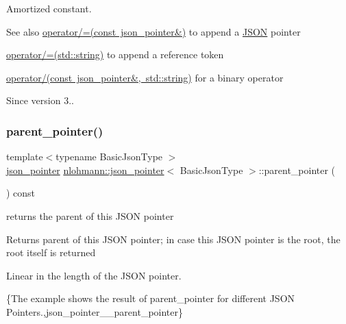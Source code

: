 Amortized constant.

\begin{DoxySeeAlso}{See also}
\mbox{\hyperlink{classnlohmann_1_1json__pointer_a7395bd0af29ac23fd3f21543c935cdfa}{operator/=(const json\+\_\+pointer\&)}} to append a \mbox{\hyperlink{cliente_8cpp_ab6104b89642419db4e355b7b2e40abbe}{J\+S\+ON}} pointer 

\mbox{\hyperlink{classnlohmann_1_1json__pointer_abdd21567b2b1d69329af0f520335e68b}{operator/=(std\+::string)}} to append a reference token 

\mbox{\hyperlink{classnlohmann_1_1json__pointer_a926c9065dbed1bedc17857a813f7a46f}{operator/(const json\+\_\+pointer\&, std\+::string)}} for a binary operator
\end{DoxySeeAlso}
\begin{DoxySince}{Since}
version 3.. 
\end{DoxySince}
\mbox{\label{classnlohmann_1_1json__pointer_afdaacce1edb7145e0434e014f0e8685a}} 
\subsubsection{\texorpdfstring{parent\+\_\+pointer()}{parent\_pointer()}}
{\footnotesize\ttfamily template$<$typename Basic\+Json\+Type $>$ \\
\mbox{\hyperlink{classnlohmann_1_1json__pointer}{json\+\_\+pointer}} \mbox{\hyperlink{classnlohmann_1_1json__pointer}{nlohmann\+::json\+\_\+pointer}}$<$ Basic\+Json\+Type $>$\+::parent\+\_\+pointer (\begin{DoxyParamCaption}{ }\end{DoxyParamCaption}) const\hspace{0.3cm}{\ttfamily [inline]}}



returns the parent of this J\+S\+ON pointer 

\begin{DoxyReturn}{Returns}
parent of this J\+S\+ON pointer; in case this J\+S\+ON pointer is the root, the root itself is returned
\end{DoxyReturn}
Linear in the length of the J\+S\+ON pointer.

\{The example shows the result of {\ttfamily parent\+\_\+pointer} for different J\+S\+ON Pointers.,json\+\_\+pointer\+\_\+\+\_\+parent\+\_\+pointer\}

